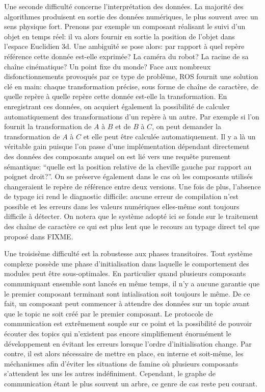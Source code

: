 Une seconde difficulté concerne l'interprétation des données. La
majorité des algorithmes produisent en sortie des données numériques,
le plus souvent avec un sens physique fort. Prenons par exemple un
composant réalisant le suivi d'un objet en temps réel: il va alors
fournir en sortie la position de l'objet dans l'espace Euclidien
3d. Une ambiguïté se pose alors: par rapport à quel repère référence
cette donnée est-elle exprimée? La caméra du robot? La racine de sa
chaîne cinématique? Un point fixe du monde? Face aux nombreux
disfonctionnements provoqués par ce type de problème, ROS fournit une
solution clé en main: chaque transformation précise, sous forme de
chaîne de caractère, de quelle repère à quelle repère cette donnée
est-elle la transformation. En enregistrant ces données, on acquiert
également la possibilité de calculer automatiquement des
transformations d'un repère à un autre. Par exemple si l'on fournit la
transformation de $A$ à $B$ et de $B$ à $C$, on peut demander la
transformation de $A$ à $C$ et elle peut être calculée
automatiquement. Il y a là un véritable gain puisque l'on passe d'une
implémentation dépendant directement des données des composants auquel
on est lié vers une requête purement sémantique: ``quelle est la
position relative de la cheville gauche par rapport au poignet
droit?''. On se préserve également dans le cas où les composants
utilisés changeraient le repère de référence entre deux versions. Une
fois de plus, l'absence de typage ici rend le diagnostic difficile:
aucune erreur de compilation n'est possible et les erreurs dans les
valeurs numériques elles-même sont toujours difficile à détecter. On
notera que le système adopté ici se fonde sur le traitement des chaîne
de caractère ce qui est plus lent que le recours au typage direct tel
que proposé dans FIXME.


Une troisisème difficulté est la robustesse aux phases
transitoires. Tout système complexe possède une phase d'initialisation
dans laquelle le comportement des modules peut être sous-optimales. En
particulier quand plusieurs composants communiquant ensemble sont
lancés en même temps, il n'y a aucune garantie que le premier
composant terminant sont intialisation soit toujours le même. De ce
fait, un composant peut commencer à attendre des données sur un topic
avant que le topic ne soit créé par le premier composant. Le protocole
de communication est extrêmement souple sur ce point et la possibilité
de pouvoir écouter des topics qui n'existent pas encore simplifiement
énormément le développement en évitant les erreurs lorsque l'ordre
d'initialisation change. Par contre, il est alors nécessaire de mettre
en place, en interne et soit-même, les méchanismes afin d'éviter les
situations de famine où plusieurs composants s'attendent les uns les
autres indéfiniment. Cependant, le graphe de communication étant le
plus souvent un arbre, ce genre de cas reste peu courant.


